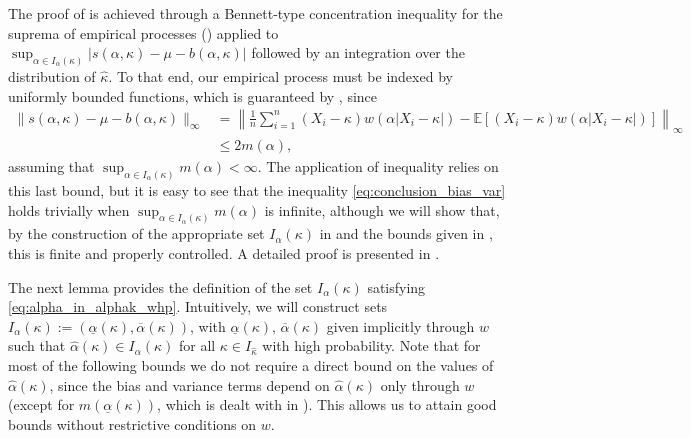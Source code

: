 \documentclass{article}
\theoremstyle{plain}
\theoremstyle{definition}
\newcommand{\E}{\mathbb{E}} %
\begin{document}
The proof of  is achieved through a Bennett-type concentration inequality for the suprema of empirical processes () applied to $\sup_{\alpha \in I_\alpha (\kappa ) }\lvert  s(\alpha,\kappa )-\mu-b(\alpha,\kappa)\rvert $ followed by an integration over the distribution of \( \widehat{\kappa }\). To that end, our empirical process must be indexed by uniformly bounded functions, which is guaranteed by , since \begin{align*}
  \|s(\alpha,\kappa  )-\mu -b(\alpha,\kappa  )\|_{\infty}&=\left\|\frac{1}{n}\sum_{i=1}^n(X_i-\kappa )w(\alpha |X_i-\kappa |)-\E[(X_i-\kappa )w(\alpha |X_i-\kappa |)]\right\|_{\infty}\\
&\le 2m(\alpha ), \end{align*}
    assuming that \( \sup_{\alpha \in I_\alpha (\kappa )} m(\alpha)<\infty \). The application of  inequality relies on this last bound, but it is easy to see that the inequality \eqref{eq:conclusion_bias_var} holds trivially when \( \sup_{\alpha \in I_\alpha (\kappa )} m(\alpha ) \) is infinite, although we will show that, by the construction of the appropriate set \( I_\alpha (\kappa ) \) in  and the bounds given in  , this is finite and properly controlled.   
	A detailed proof is presented in .

The next lemma provides the definition of the set \( I_\alpha (\kappa )\) satisfying \eqref{eq:alpha_in_alphak_whp}. 
Intuitively, we will construct sets \( I_\alpha(\kappa  ):=(\underline{\alpha }(\kappa ),\overline{\alpha }(\kappa )) \), with $\underline{\alpha}(\kappa),\,\overline{\alpha}(\kappa)$
given implicitly through $w$ such that \( \widehat{\alpha}(\kappa )\in I_\alpha(\kappa )  \) for all \( \kappa  \in I_{\widehat{\kappa } } \) with high probability. Note that for most of the following bounds we do not require a direct bound on the values of $\widehat{\alpha}(\kappa)$, since the bias and variance terms depend on $\widehat{\alpha}(\kappa)$ only through $w$ (except for $m(\underline{\alpha}(\kappa))$, which is dealt with in ). This allows us to attain good bounds without restrictive conditions on $w$.
\end{document}
